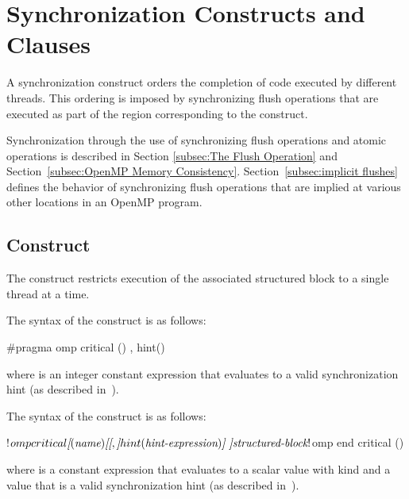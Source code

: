 \section{Synchronization Constructs and Clauses}
\label{sec:Synchronization Constructs and Clauses}
A synchronization construct orders the completion of code executed by
different threads. This ordering is imposed by synchronizing flush operations
that are executed as part of the region corresponding to the construct.

Synchronization through the use of synchronizing flush operations and atomic
operations is described in Section \ref{subsec:The Flush Operation} and
Section~\ref{subsec:OpenMP Memory Consistency}.  Section~\ref{subsec:implicit flushes}
defines the behavior of synchronizing flush operations that are
implied at various other locations in an OpenMP program.

\subsection{ Construct}
\label{subsec:critical Construct}
\summary
The  construct restricts execution of the associated structured block to a
single thread at a time.

\syntax
\begin{ccppspecific}
The syntax of the  construct is as follows:

\begin{ompcPragma}
  #pragma omp critical \plc{[}() \plc{[[},\plc{]} hint()\plc{] ] new-line}
\end{ompcPragma}

where  is an integer constant expression that
evaluates to a valid synchronization hint (as described in~).
\end{ccppspecific}

\begin{fortranspecific}
The syntax of the  construct is as follows:

\begin{ompfPragma}
!$omp critical \plc{[}(\plc{name}) \plc{[[},\plc{]} hint(\plc{hint-expression})\plc{] ]}
    \plc{structured-block}
!$omp end critical \plc{[}()\plc{]}
\end{ompfPragma}

where  is a constant expression that evaluates to
a scalar value with kind  and  a value
that is a valid synchronization hint (as described
in~).
\end{fortranspecific}


